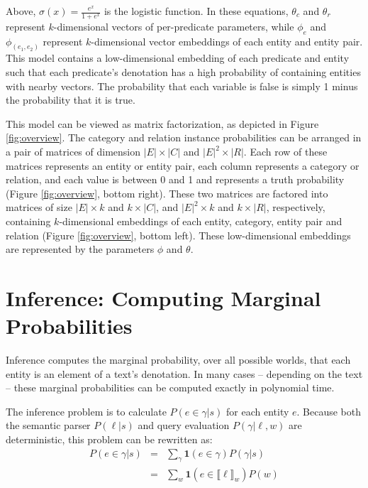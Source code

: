 \documentclass[11pt]{article}
\begin{document}
Above, $\sigma (x) = \frac{e^x}{1 + e^x}$ is the logistic function. In
these equations, $\theta_c$ and $\theta_r$ represent $k$-dimensional
vectors of per-predicate parameters, while $\phi_e$ and $\phi_{(e_1,
  e_2)}$ represent $k$-dimensional vector embeddings of each entity
and entity pair. This model contains a low-dimensional embedding of
each predicate and entity such that each predicate's denotation has a
high probability of containing entities with nearby vectors. The
probability that each variable is false is simply 1 minus the
probability that it is true.


This model can be viewed as matrix factorization, as depicted in
Figure \ref{fig:overview}. The category and relation instance
probabilities can be arranged in a pair of matrices of dimension $|E|
\times |C|$ and $|E|^2 \times |R|$. Each row of these matrices
represents an entity or entity pair, each column represents a category
or relation, and each value is between 0 and 1 and represents a truth
probability (Figure \ref{fig:overview}, bottom right). These two
matrices are factored into matrices of size $|E| \times k$ and $k
\times |C|$, and $|E|^2 \times k$ and $k \times |R|$, respectively,
containing $k$-dimensional embeddings of each entity, category, entity
pair and relation (Figure \ref{fig:overview}, bottom left). These
low-dimensional embeddings are represented by the parameters $\phi$
and $\theta$.




\section{Inference: Computing Marginal Probabilities}
\label{sec:inference}

Inference computes the marginal probability, over all possible worlds,
that each entity is an element of a text's denotation. In many cases
-- depending on the text -- these marginal probabilities can be
computed exactly in polynomial time.

The inference problem is to calculate $P(e \in \gamma | s)$ for each
entity $e$. Because both the semantic parser $P(\ell | s)$ and query
evaluation $P(\gamma | \ell, w)$ are deterministic, this problem can
be rewritten as:
\begin{eqnarray*}
P(e \in \gamma | s) & = & \sum_\gamma \textbf{1}(e \in \gamma) P(\gamma | s) \\
& = & \sum_w \textbf{1}(e \in \llbracket \ell \rrbracket_w) P(w) 
\end{eqnarray*}
\end{document}
